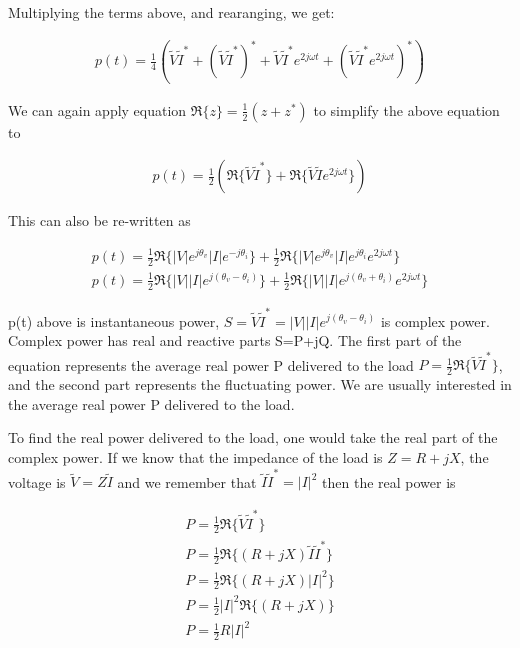 \documentclass{ximera}
\begin{document}
Multiplying the terms above, and rearanging, we get:


\begin{eqnarray}
p(t)=\frac{1}{4} (\tilde{V}\tilde{I}^*+ (\tilde{V}\tilde{I}^*)^*+ \tilde{V}\tilde{I}^* e^{2j \omega t}+ (\tilde{V}\tilde{I}^* e^{2j \omega t})^*)
\end{eqnarray}

We can again apply equation $\Re\{z\}=\frac{1}{2}(z +z^*)$ to simplify the above equation to

\begin{eqnarray}
p(t)=\frac{1}{2} (\Re\{\tilde{V}\tilde{I}^*\}+ \Re\{\tilde{V}\tilde{I} e^{2j \omega t }\})
\end{eqnarray}

This can also be re-written as

\begin{eqnarray}
p(t)=\frac{1}{2} \Re\{ |V| e^{j\theta_v} |I| e^{-j\theta_i} \}+ \frac{1}{2} \Re\{|V| e^{j\theta_v} |I| e^{j\theta_i} e^{2j \omega t }\} \\
p(t)=\frac{1}{2} \Re\{ |V| |I| e^{j(\theta_v-\theta_i)} \}+ \frac{1}{2} \Re\{|V| |I|  e^{j(\theta_v+\theta_i)}  e^{2j \omega t }\}
\end{eqnarray}


p(t) above is instantaneous power, $S=\tilde{V}\tilde{I}^*=|V| |I| e^{j(\theta_v-\theta_i)}$ is complex power. Complex power has real and reactive parts S=P+jQ. The first part of the equation represents the average real power P delivered to the load $P=\frac{1}{2}\Re\{\tilde{V}\tilde{I}^*\}$, and the second part represents the fluctuating power. We are usually interested in the average real power P delivered to the load.

To find the real power delivered to the load, one would take the real part of the complex power. If we know that the impedance of the load is $Z=R+jX$, the voltage is $ \tilde{V} = Z \tilde{I}$ and we remember that $\tilde{I} \tilde{I}^* = |I|^2$ then the real power is

\begin{eqnarray}
P=\frac{1}{2}\Re\{ \tilde{V} \tilde{I}^*  \} \\
P=\frac{1}{2}\Re\{ (R+jX) \tilde{I} \tilde{I}^*  \} \\
P=\frac{1}{2}\Re\{ (R+jX) |I|^2  \} \\
P=\frac{1}{2}|I|^2 \Re\{ (R+jX)   \} \\
P=\frac{1}{2}R |I|^2 
\end{eqnarray}
\end{document}
